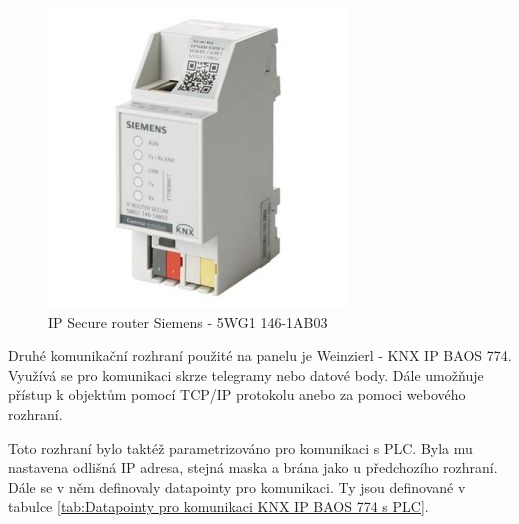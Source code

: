 \begin{figure}[!ht]
  \begin{center}
    \includegraphics[scale=0.55]{obrazky/Siemens router.jpg}
  \end{center}
  \caption[IP Secure router Siemens - 5WG1 146-1AB03 \cite{Siemens IP}]{IP Secure router Siemens - 5WG1 146-1AB03 \cite{Siemens IP}}
  \label{fig:IP Secure router Siemens - 5WG1 146-1AB03}
\end{figure}

Druhé komunikační rozhraní použité na panelu je Weinzierl - KNX IP BAOS 774. Využívá se pro komunikaci skrze telegramy nebo datové body. Dále umožňuje přístup k objektům pomocí TCP/IP protokolu anebo za pomoci webového rozhraní. \cite{Weinzier}

Toto rozhraní bylo taktéž parametrizováno pro komunikaci s PLC. Byla mu nastavena odlišná IP adresa, stejná maska a brána jako u předchozího rozhraní. Dále se v něm definovaly datapointy pro komunikaci. Ty jsou definované v tabulce \ref{tab:Datapointy pro komunikaci KNX IP BAOS 774 s PLC}.

